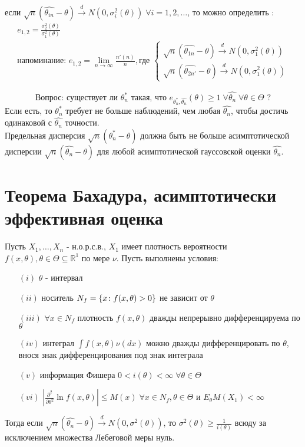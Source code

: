 \begin{enumerate}
	если $\sqrt{n} (\hat{\theta_{in}} - \theta) \xrightarrow[]{d} N(0, \sigma_i^2 (\theta)) \; \forall i = 1, 2, \dots$, то можно определить :
	$$\begin{gathered}
		e_{1,2} = \frac{\sigma_2^2 (\theta)}{\sigma_1^2 (\theta)} \\
		\text{напоминание: } e_{1,2} = \underset{n\to \infty}{\lim} \frac{n' (n)}{n}, \text{где } \begin{cases}
			\sqrt{n} (\hat{\theta_{1n}} - \theta) \xrightarrow[]{d} N(0, \sigma_1^2 (\theta))\\
			\sqrt{n} (\hat{\theta_{2n'}} - \theta) \xrightarrow[]{d} N(0, \sigma_1^2 (\theta))
		\end{cases}
	\end{gathered}$$
\end{enumerate}

$$\text{Вопрос: существует ли }\theta_n^{*} \text{ такая, что } e_{\theta_n^{*}, \hat{\theta_n}} (\theta) \ge 1 \; \forall \hat{\theta_n} \; \forall \theta \in \Theta\text{ ?}$$
Если есть, то $\theta_n^{*}$ требует не больше наблюдений, чем любая $\hat{\theta_n}$, чтобы достичь одинаковой с $\hat{\theta_n}$ точности.\\

Предельная дисперсия $\sqrt{n}(\theta_n^{*} - \theta)$ должна быть не больше асимптотической дисперсии $\sqrt{n}(\hat{\theta_n} - \theta)$ для любой асимптотической гауссовской оценки $\hat{\theta_n}$.

\section{Теорема Бахадура, асимптотически эффективная оценка}\label{lec:2/sec:1}

\begin{theorem}\label{lec:2/the:1}
	Пусть $X_1, \dots, X_n$ - н.о.р.с.в., $X_1$ имеет плотность вероятности $f(x, \theta), \theta \in \Theta \subseteq \mathbb{R}^1$ по мере $\nu$. Пусть выполнены условия:
	\begin{itemize}
		\item[$(i)$] $\theta$ - интервал
		\item[$(ii)$] носитель $N_f = \left\{x\colon f(x,\theta) > 0\right\}$ не зависит от $\theta$
		\item[$(iii)$] $\forall x \in N_f$ плотность $f(x, \theta)$ дважды непрерывно дифференцируема по $\theta$
		\item[$(iv)$] интеграл $\int f(x, \theta) \nu (dx)$ можно дважды дифференцировать по $\theta$, внося знак дифференцирования под знак интеграла
		\item[$(v)$] информация Фишера $0 < i(\theta) < \infty \; \forall \theta \in \Theta$
		\item[$(vi)$] $|\frac{\partial^2}{\partial \theta^2} \ln f(x,\theta)| \le M(x) \; \forall x \in N_f, \theta \in \Theta$ и $E_{\theta} M(X_1) < \infty$
	\end{itemize}
	Тогда если $\sqrt{n}(\hat{\theta_n} - \theta) \xrightarrow[]{d}N(0, \sigma^2(\theta))$, то $\sigma^2 (\theta) \ge \frac{1}{i(\theta)}$ всюду за исключением множества Лебеговой меры нуль.
\end{theorem}

